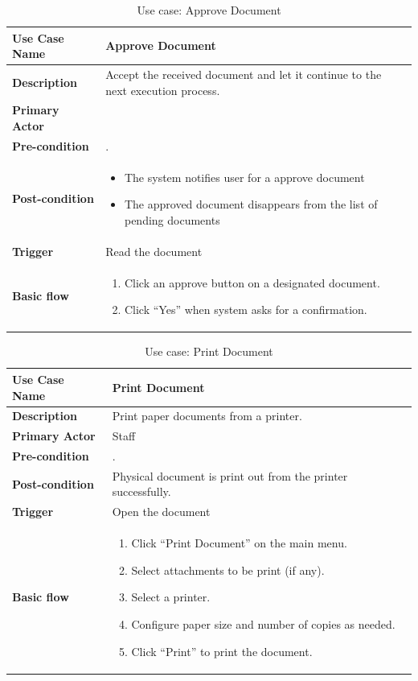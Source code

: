 \begin{table}
	\centering
	\caption{Use case: Approve Document}
	\begin{tabular}{|l|L{9cm}|}
		\hline
		\textbf{Use Case Name} & Approve Document \\
		\hline
		
		\textbf{Description} & Accept the received document and let it continue to the next execution process. \\
		\textbf{Primary Actor} & \allICPersonel \\
		\textbf{Pre-condition} & \alreadylogin. \\
		\textbf{Post-condition} & 
		\begin{itemize}
			\item The system notifies user for a approve document
			\item The approved document disappears from the list of pending documents
		\end{itemize} \\
		\textbf{Trigger} & Read the document \\
		\textbf{Basic flow} & 
		\begin{enumerate}
			\item Click an approve button on a designated document.
			\item Click \enquote{Yes} when system asks for a confirmation.
		\end{enumerate} \\
		\hline
	\end{tabular}
\end{table}

\begin{table}
	\centering
	\caption{Use case: Print Document}
	\begin{tabular}{|l|L{9cm}|}
		\hline
		\textbf{Use Case Name} & Print Document \\
		\hline
		
		\textbf{Description} & Print paper documents from a printer. \\
		\textbf{Primary Actor} & Staff \\
		\textbf{Pre-condition} & \alreadylogin. \\
		\textbf{Post-condition} & Physical document is print out from the printer successfully. \\
		\textbf{Trigger} & Open the document \\
		\textbf{Basic flow} & 
		\begin{enumerate}
			\item Click \enquote{Print Document} on the main menu.
			\item Select attachments to be print (if any).
			\item Select a printer.
			\item Configure paper size and number of copies as needed.
			\item Click \enquote{Print} to print the document.
		\end{enumerate} \\
		\hline
	\end{tabular}
\end{table}

